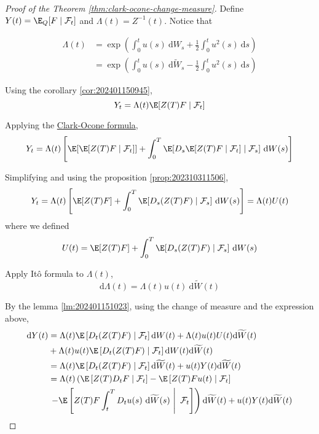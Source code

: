 \begin{proof}[Proof of the Theorem \ref{thm:clark-ocone-change-measure}]

Define $Y(t) = \E_Q [F \mid \mathcal{F}_t]$ and $\Lambda(t) = Z^{-1}(t)$. Notice that

\begin{equation*}
\begin{aligned}
	\Lambda(t) &= \exp \left(\int_0^t u(s) ~\mathrm{d}W_s + \frac{1}{2} \int_0^t u^2(s) ~\mathrm{d}s \right) \\
						 &= \exp \left(\int_0^t u(s) ~\mathrm{d}\widetilde{W}_s - \frac{1}{2} \int_0^t u^2(s) ~\mathrm{d}s \right)
\end{aligned}
\end{equation*}

Using the corollary \ref{cor:202401150945}, 
\[
Y_t = \Lambda(t) \E[Z(T) F \mid \mathcal{F}_t]
\]


Applying the \hyperref[thm:clark-ocone]{Clark-Ocone formula},
\[
Y_t = \Lambda(t) \left[ \E[\E[Z(T) F \mid \mathcal{F}_t]] + \int_0^T \E[D_s \E[Z(T) F \mid \mathcal{F}_t] \mid \mathcal{F}_s] ~\mathrm{d}W(s) \right]
\]

Simplifying and using the proposition \ref{prop:202310311506},
\[
Y_t = \Lambda(t) \left[ \E[Z(T) F] + \int_0^T \E[D_s (Z(T) F) \mid \mathcal{F}_s] ~\mathrm{d}W(s) \right] = \Lambda(t) U(t)
\]
where we defined
\[
U(t) = \E[Z(T) F] + \int_0^T \E[D_s (Z(T) F) \mid \mathcal{F}_s] ~\mathrm{d}W(s)
\]

Apply Itô formula to $\Lambda(t)$,
\begin{equation*}
	\mathrm{d} \Lambda(t) = \Lambda(t) u(t) ~\mathrm{d} \widetilde{W}(t)
\end{equation*}

By the lemma \ref{lm:202401151023}, using the change of measure and the expression above,
\begin{equation*}
\begin{aligned}
	\mathrm{d} Y(t) &= \Lambda(t) \E\left[D_t(Z(T) F) \mid \mathcal{F}_t\right] \mathrm{d} W(t)+\Lambda(t) u(t) U(t) \mathrm{d} \widetilde{W}(t) \\
	& +\Lambda(t) u(t) \E \left[D_t(Z(T) F) \mid \mathcal{F}_t\right] \mathrm{d} W(t) \mathrm{d} \widetilde{W}(t) \\
	& =\Lambda(t) \E \left[D_t(Z(T) F) \mid \mathcal{F}_t\right] \mathrm{d} \widetilde{W}(t)+u(t) Y(t) \mathrm{d} \widetilde{W}(t) \\
	& =\Lambda(t)\left(\E \left[Z(T) D_t F \mid \mathcal{F}_t\right]- \E \left[Z(T) F u(t) \mid \mathcal{F}_t\right]\right. \\
	& \left.\left.-\E\left[Z(T) F \int_t^T D_t u(s) ~\mathrm{d} \widetilde{W}(s) ~\right|~ \mathcal{F}_t\right]\right) \mathrm{d} \widetilde{W}(t)+u(t) Y(t) \mathrm{d} \widetilde{W}(t)
\end{aligned}
\end{equation*}


\end{proof}
